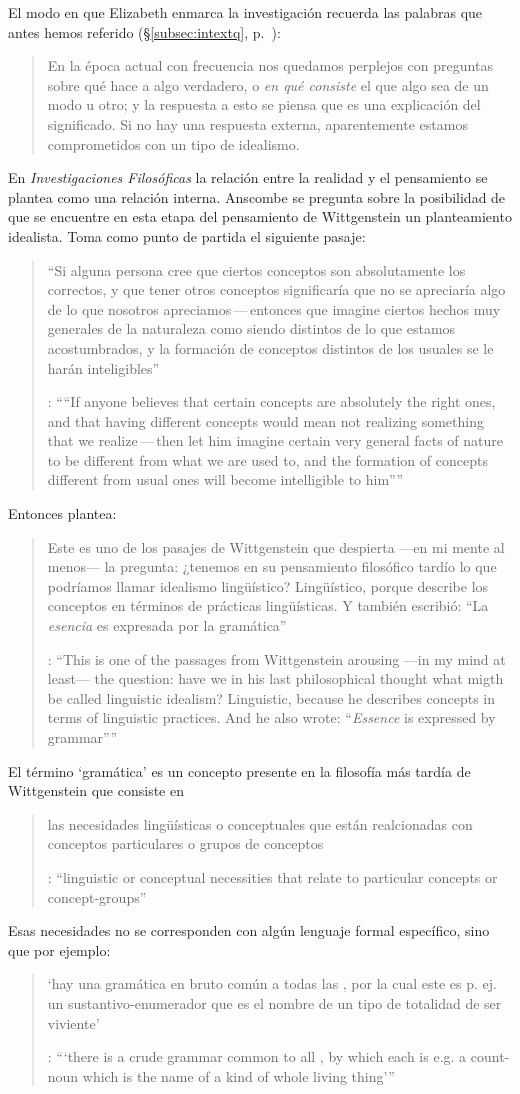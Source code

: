 El modo en que Elizabeth enmarca la investigación recuerda las palabras que antes hemos referido (\S\ref{subsec:intextq}, p.~\pageref{subsec:intextq}): \blockquote[]{En la época actual con frecuencia nos quedamos perplejos con preguntas sobre qué hace a algo verdadero, o \emph{en qué consiste} el que algo sea de un modo u otro; y la respuesta a esto se piensa que es una explicación del significado. Si no hay una respuesta externa, aparentemente estamos comprometidos con un tipo de idealismo.} En \emph{Investigaciones Filosóficas} la relación entre la realidad y el pensamiento se plantea como una relación interna. Anscombe se pregunta sobre la posibilidad de que se encuentre en esta etapa del pensamiento de Wittgenstein un planteamiento idealista. Toma como punto de partida el siguiente pasaje: \blockquote[{\cite[112]{anscombe1981parmenides:qli}}: \enquote{``If anyone believes that certain concepts are absolutely the right ones, and that having different concepts would mean not realizing something that we realize\,---\,then let him imagine certain very general facts of nature to be different from what we are used to, and the formation of  concepts different from usual ones will become intelligible to him''}]{``Si alguna persona cree que ciertos conceptos son absolutamente los correctos, y que tener otros conceptos significaría que no se apreciaría algo de lo que nosotros apreciamos\,---\,entonces que imagine ciertos hechos muy generales de la naturaleza como siendo distintos de lo que estamos acostumbrados, y la formación de conceptos distintos de los usuales se le harán inteligibles''}. Entonces plantea: \blockquote[{\cite[112]{anscombe1981parmenides:qli}}: \enquote{This is one of the passages from Wittgenstein arousing ---in my mind at least--- the question: have we in his last philosophical thought what migth be called linguistic idealism? Linguistic, because he describes concepts in terms of linguistic practices. And he also wrote: ``\emph{Essence} is expressed by grammar''}]{Este es uno de los pasajes de Wittgenstein que despierta ---en mi mente al menos--- la pregunta: ¿tenemos en su pensamiento filosófico tardío lo que podríamos llamar idealismo lingüístico? Lingüístico, porque describe los conceptos en términos de prácticas lingüísticas. Y también escribió: ``La \emph{esencia} es expresada por la gramática''}. El término `gramática' es un concepto presente en la filosofía más tardía de Wittgenstein que consiste en \blockquote[{\cite[215]{teichmann2008ans}}: \enquote{linguistic or conceptual necessities that relate to particular concepts or concept-groups}]{las necesidades lingüísticas o conceptuales que están realcionadas con conceptos particulares o grupos de conceptos}. Esas necesidades no se corresponden con algún lenguaje formal específico, sino que por ejemplo: \blockquote[{\cite[215]{teichmann2008ans}}: \enquote{`there is a crude grammar common to all , by which each is e.g. a count-noun which is the name of a kind of whole living thing'}]{`hay una gramática en bruto común a todas las , por la cual este es p. ej. un sustantivo-enumerador que es el nombre de un tipo de totalidad de ser viviente'}.

